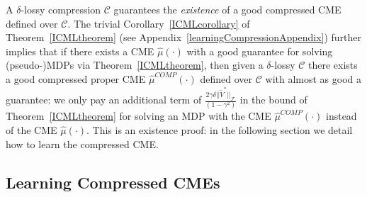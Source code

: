 \documentclass[letterpaper]{article}
\newcommand{\cC}{{\mathcal C}}
\newcommand{\cF}{{\mathcal F}}
\begin{document}
A $\delta$-lossy compression $\cC$ guarantees the \emph{existence} of a good compressed CME defined over $\cC$. The trivial Corollary~\ref{ICMLcorollary} of Theorem~\ref{ICMLtheorem} (see Appendix~\ref{learningCompressionAppendix}) further implies that if there exists a CME $\hat\mu(\cdot)$ with a good guarantee for solving (pseudo-)MDPs via Theorem~\ref{ICMLtheorem}, then given a $\delta$-lossy $\cC$ there exists a good compressed proper CME $\hat\mu^{COMP}(\cdot)$ defined over $\cC$ with almost as good a guarantee: we only pay an additional term of $\frac{2\gamma \delta||\tilde V^*||_{\cF}}{(1-\gamma^2)}$ in the bound of Theorem~\ref{ICMLtheorem} for solving an MDP with the CME $\hat\mu^{COMP}(\cdot)$ instead of the CME $\hat\mu(\cdot)$. This is an existence proof: in the following section we detail how to learn the compressed CME.

\subsection{Learning Compressed CMEs} \label{LearningCompressedModel}
\end{document}
